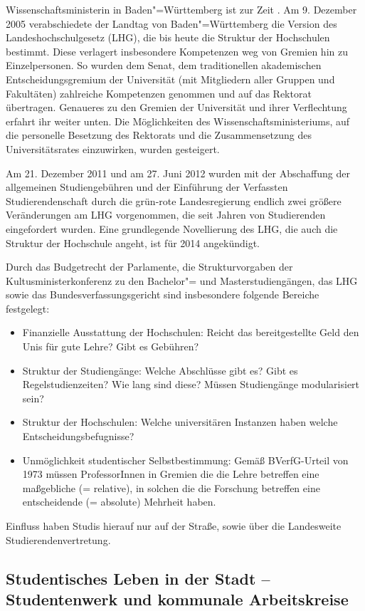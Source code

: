 Wissenschaftsministerin in Baden"=Württemberg ist zur Zeit \wissenschaftsministerbawue .
Am 9. Dezember 2005 verabschiedete der Landtag von Baden"=Württemberg die Version des Landeshochschulgesetz (LHG), die bis heute die Struktur der Hochschulen bestimmt. Diese verlagert insbesondere Kompetenzen weg von Gremien hin zu Einzelpersonen. So wurden dem Senat, dem traditionellen akademischen Entscheidungsgremium der Universität (mit Mitgliedern aller Gruppen und Fakultäten) zahlreiche Kompetenzen genommen und auf das Rektorat übertragen. Genaueres zu den Gremien der Universität und ihrer Verflechtung erfahrt ihr weiter unten. Die Möglichkeiten des Wissenschaftsministeriums, auf die personelle Besetzung des Rektorats und die Zusammensetzung des Universitätsrates einzuwirken, wurden gesteigert.

Am 21. Dezember 2011 und am 27. Juni 2012 wurden mit der Abschaffung der allgemeinen Studiengebühren und der Einführung der Verfassten Studierendenschaft durch die grün-rote Landesregierung endlich zwei größere Veränderungen am LHG vorgenommen, die seit Jahren von Studierenden eingefordert wurden. Eine grundlegende Novellierung des LHG, die auch die Struktur der Hochschule angeht, ist für 2014 angekündigt.

Durch das Budgetrecht der Parlamente, die Strukturvorgaben der Kultusministerkonferenz zu den Bachelor"= und Masterstudiengängen, das LHG sowie das Bundesverfassungsgericht sind insbesondere folgende Bereiche festgelegt:
\begin{itemize}
\item Finanzielle Ausstattung der Hochschulen: Reicht das bereitgestellte Geld den Unis für gute Lehre? Gibt es Gebühren?
\item Struktur der Studiengänge: Welche Abschlüsse gibt es? Gibt es Regelstudienzeiten? Wie lang sind diese? Müssen Studiengänge modularisiert sein?
\item Struktur der Hochschulen: Welche universitären Instanzen haben welche Entscheidungsbefugnisse?
\item Unmöglichkeit studentischer Selbstbestimmung: Gemäß BVerfG-Urteil von 1973 müssen ProfessorInnen in Gremien die die Lehre betreffen eine maßgebliche (= relative), in solchen die die Forschung betreffen eine entscheidende (= absolute) Mehrheit haben.
\end{itemize}

Einfluss haben Studis hierauf nur auf der Straße, sowie über die Landesweite Studierendenvertretung.


\subsection{Studentisches Leben in der Stadt -- Studentenwerk und kommunale Arbeitskreise}

